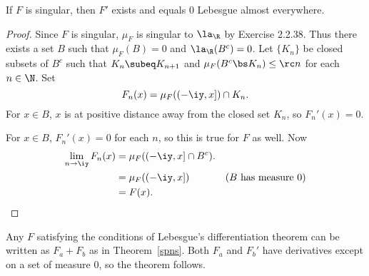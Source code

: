\begin{lem}
If $F$ is singular, then $F'$ exists and equals 0 Lebesgue almost everywhere. %
\end{lem}
\begin{proof}
Since $F$ is singular, $\mu_F$ is singular to $\la_{\R}$ by Exercise 2.2.38. Thus there exists a set $B$ such that $\mu_F(B)=0$ and $\la_{\R}(B^c)=0$. Let $\{K_n\}$ be closed subsets of $B^c$ such that $K_n\subeq K_{n+1}$ and $\mu_F(B^c\bs K_n)\le \rc n$ for each $n\in \N$.
Set
\[F_n(x)=\mu_F((-\iy, x])\cap K_n.\]
For $x\in B$, $x$ is at positive distance away from the closed set $K_n$, so $F_n'(x)=0$. 
%

For $x\in B$, $F_n'(x)=0$ for each $n$, so this is true for $F$ as well. 
Now
\begin{align*}
\lim_{n\to \iy} F_n(x)&=\mu_F((-\iy, x]\cap B^c).\\
&=\mu_F((-\iy, x])&(B \text{ has measure 0})\\
&=F(x).
\end{align*}
\end{proof}
Any $F$ satisfying the conditions of Lebesgue's differentiation theorem can be written as $F_a+F_b$ as in Theorem~\ref{spns}. Both $F_a$ and $F_b'$ have derivatives except on a set of measure 0, so the theorem follows.
